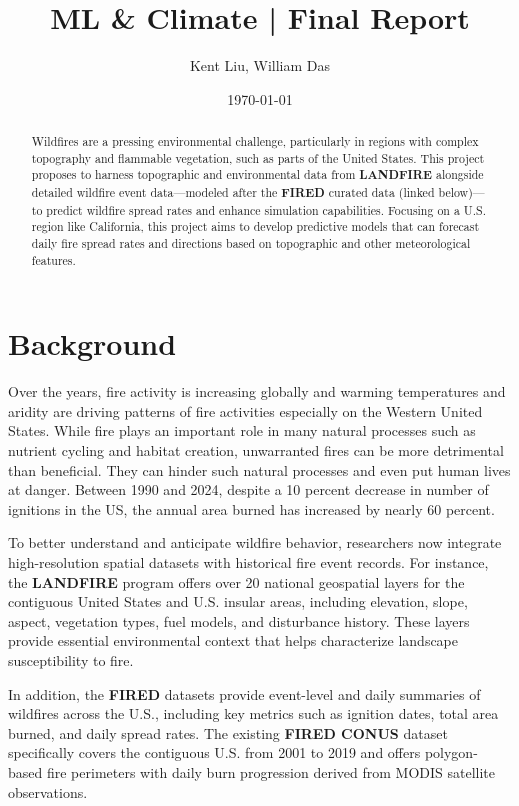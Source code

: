 \documentclass{article}
\begin{document}
\title{\textbf{ML \& Climate | Final Report}}
\date{\today}
\author{Kent Liu, William Das}

\maketitle

\begin{abstract}
    Wildfires are a pressing environmental challenge, particularly in regions with complex topography and flammable vegetation, such as parts of the United States. This project proposes to harness topographic and environmental data from \textbf{LANDFIRE} alongside detailed wildfire event data—modeled after the \textbf{FIRED} curated data (linked below)—to predict wildfire spread rates and enhance simulation capabilities. Focusing on a U.S. region like California, this project aims to develop predictive models that can forecast daily fire spread rates and directions based on topographic and other meteorological features.

\end{abstract}

\section{Background}
Over the years, fire activity is increasing globally and warming temperatures and aridity are driving patterns of fire activities especially on the Western United States. \cite{https://doi.org/10.1111/j.1365-2699.2011.02595.x} While fire plays an important role in many natural processes such as nutrient cycling and habitat creation, unwarranted fires can be more detrimental than beneficial. They can hinder such natural processes and even put human lives at danger. Between 1990 and 2024, despite a 10 percent decrease in number of ignitions in the US, the annual area burned has increased by nearly 60 percent. \cite{wibbenmeyer2021wildfires}

To better understand and anticipate wildfire behavior, researchers now integrate high-resolution spatial datasets with historical fire event records. For instance, the \textbf{LANDFIRE} program \cite{landfire} offers over 20 national geospatial layers for the contiguous United States and U.S. insular areas, including elevation, slope, aspect, vegetation types, fuel models, and disturbance history. These layers provide essential environmental context that helps characterize landscape susceptibility to fire.

In addition, the \textbf{FIRED} datasets provide event-level and daily summaries of wildfires across the U.S., including key metrics such as ignition dates, total area burned, and daily spread rates. The existing \textbf{FIRED CONUS} dataset \cite{firedpy} specifically covers the contiguous U.S. from 2001 to 2019 and offers polygon-based fire perimeters with daily burn progression derived from MODIS satellite observations.
\end{document}
